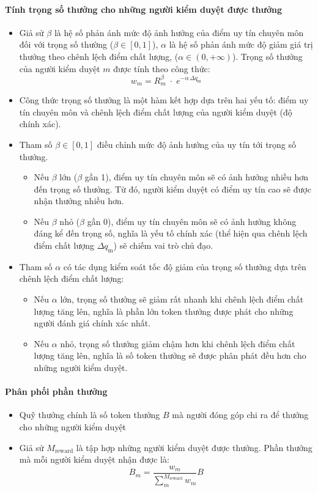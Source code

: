 \paragraph{Tính trọng số thưởng cho những người kiểm duyệt được thưởng}
\begin{itemize}
  \item Giả sử $\beta$ là hệ số phản ánh mức độ ảnh hưởng của điểm uy tín chuyên môn đối với trọng số thường ($\beta \in [0,1]$), $\alpha$ là hệ số phản ánh mức độ giảm giá trị thưởng theo chênh lệch điểm chất lượng, ($\alpha \in (0, +\infty)$). Trọng số thưởng của người kiểm duyệt $m$ được tính theo công thức: 
    \[w_m = R_m^{\beta}\;\cdot\;e^{-\alpha\,\Delta q_{\text{m}}} \]

  \item Công thức trọng số thưởng là một hàm kết hợp dựa trên hai yếu tố: điểm uy tín chuyên môn và chênh lệch điểm chất lượng của người kiểm duyệt (độ chính xác).
  \item Tham số $\beta \in [0, 1]$ điều chỉnh mức độ ảnh hưởng của uy tín tới trọng số thưởng. 
  \begin{itemize}
    \item Nếu $\beta$ lớn ($\beta$ gần 1), điểm uy tín chuyên môn sẽ có ảnh hưởng nhiều hơn đến trọng số thưởng. Từ đó, người kiểm duyệt có điểm uy tín cao sẽ được nhận thưởng nhiều hơn.
    \item Nếu $\beta$ nhỏ ($\beta$ gần 0), điểm uy tín chuyên môn sẽ có ảnh hưởng không đáng kể đến trọng số, nghĩa là yếu tố chính xác (thể hiện qua chênh lệch điểm chất lượng $\Delta q_{\text{m}}$) sẽ chiếm vai trò chủ đạo.
  \end{itemize}
  \item Tham số $\alpha$ có tác dụng kiểm soát tốc độ giảm của trọng số thưởng dựa trên chênh lệch điểm chất lượng:
    \begin{itemize}
      \item Nếu $\alpha$ lớn, trọng số thưởng sẽ giảm rất nhanh khi chênh lệch điểm chất lượng tăng lên, nghĩa là phần lớn token thưởng được phát cho những người đánh giá chính xác nhất.
      \item Nếu $\alpha$ nhỏ, trọng số thưởng giảm chậm hơn khi chênh lệch điểm chất lượng tăng lên, nghĩa là số token thưởng sẽ được phân phát đều hơn cho những người kiểm duyệt.
    \end{itemize}
\end{itemize}


\paragraph{Phân phối phần thưởng}
\begin{itemize}
  \item Quỹ thưởng chính là số token thưởng $B$ mà người đóng góp chi ra để thưởng cho những người kiểm duyệt
  \item Giả sử $M_{\text{reward}}$ là tập hợp những người kiểm duyệt được thưởng. Phần thưởng mà mỗi người kiểm duyệt nhận được là:
    \[B_m = \frac{w_m}{\sum_{m}^{M_{\text{reward}}}w_m} B\] 
\end{itemize}

